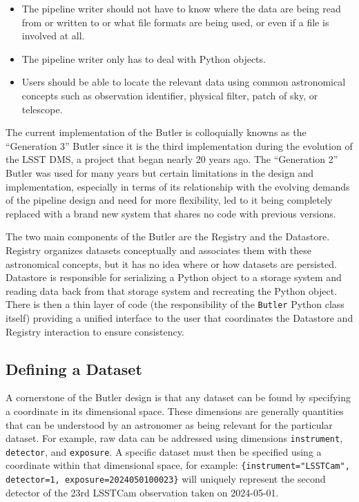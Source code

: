 \documentclass[]{spie}
\begin{document}
\begin{itemize}
\item The pipeline writer should not have to know where the data are being read from or written to or what file formats are being used, or even if a file is involved at all.
\item The pipeline writer only has to deal with Python objects.
\item Users should be able to locate the relevant data using common astronomical concepts such as observation identifier, physical filter, patch of sky, or telescope.
\end{itemize}

The current implementation of the Butler is colloquially knowns as the ``Generation 3'' Butler since it is the third implementation during the evolution of the LSST DMS, a project that began nearly 20 years ago.\cite{2006SPIE.6274E..0PK}
The ``Generation 2'' Butler was used for many years but certain limitations in the design and implementation, especially in terms of its relationship with the evolving demands of the pipeline design and need for more flexibility, led to it being completely replaced with a brand new system that shares no code with previous versions.

The two main components of the Butler are the Registry and the Datastore.
Registry organizes datasets conceptually and associates them with these astronomical concepts, but it has no idea where or how datasets are persisted.
Datastore is responsible for serializing a Python object to a storage system and reading data back from that storage system and recreating the Python object.
There is then a thin layer of code (the responsibility of the \texttt{Butler} Python class itself) providing a unified interface to the user that coordinates the Datastore and Registry interaction to ensure consistency.

\subsection{Defining a Dataset}

A cornerstone of the Butler design is that any dataset can be found by specifying a coordinate in its dimensional space.
These dimensions are generally quantities that can be understood by an astronomer as being relevant for the particular dataset.
For example, raw data can be addressed using dimensions \texttt{instrument}, \texttt{detector}, and \texttt{exposure}.
A specific dataset must then be specified using a coordinate within that dimensional space, for example: \texttt{\{instrument="LSSTCam", detector=1, exposure=2024050100023\}} will uniquely represent the second detector of the 23rd LSSTCam observation taken on 2024-05-01.
\end{document}
